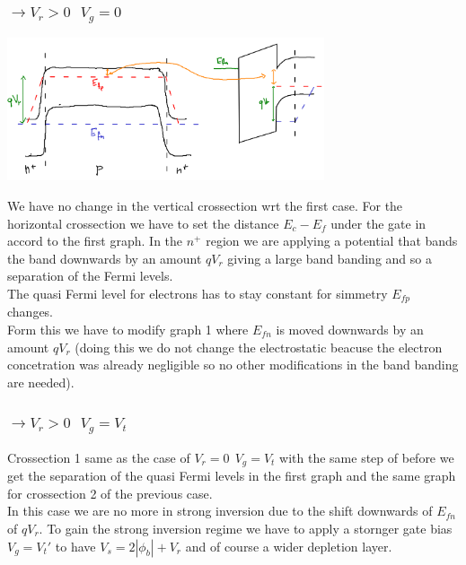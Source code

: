 \subsubsection{$\rightarrow V_r>0 \ \ \ V_g=0$}

\centering
\includegraphics[width=0.7\textwidth]{b1.png}\\
\raggedright

We have no change in the vertical crossection wrt the first case.
For the horizontal crossection we have to set the distance $E_c-E_f$ under the gate in accord to the first graph. In the $n^+$ region we are applying a potential that bands the band downwards by an amount $qV_r$ giving a large band banding and so a separation of the Fermi levels.\\
The quasi Fermi level for electrons has to stay constant for simmetry $E_{fp}$ changes.\\
Form this we have to modify graph 1 where $E_{fn}$ is moved downwards by an amount $qV_r$ (doing this we do not change the electrostatic beacuse the electron concetration was already negligible so no other modifications in the band banding are needed).\\

\subsubsection{$\rightarrow V_r>0 \ \ \  V_g=V_t$}
Crossection 1 same as the case of $V_r=0 \ \ V_g=V_t$ with the same step of before we get the separation of the quasi Fermi levels in the first graph and the same graph for crossection 2 of the previous case.\\
In this case we are no more in strong inversion due to the shift downwards of $E_{fn}$ of $qV_r$. To gain the strong inversion regime we have to apply a stornger gate bias $V_g=V_t'$ to have $V_s=2|\phi_b|+V_r$ and of course a wider depletion layer.\\

